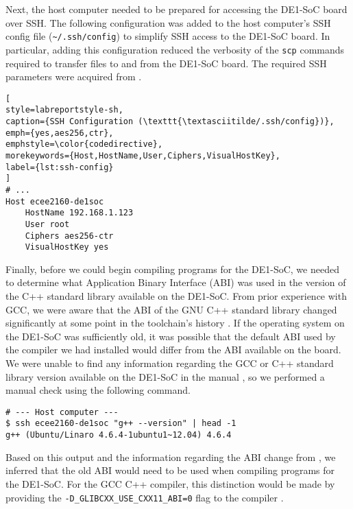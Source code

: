 \documentclass[11pt, letterpaper]{article} %
\begin{document}
Next, the host computer needed to be prepared for accessing the DE1-SoC board over SSH. The following configuration was added to the host computer's SSH config file (\texttt{\textasciitilde/.ssh/config}) to simplify SSH access to the DE1-SoC board. In particular, adding this configuration reduced the verbosity of the \texttt{scp} commands required to transfer files to and from the DE1-SoC board. The required SSH parameters were acquired from \cite{de1-soc-linux-manual,nengo-fpga-connecting-de1-soc}.

\begin{lstlisting}[
style=labreportstyle-sh, 
caption={SSH Configuration (\texttt{\textasciitilde/.ssh/config})}, 
emph={yes,aes256,ctr},
emphstyle=\color{codedirective},
morekeywords={Host,HostName,User,Ciphers,VisualHostKey},
label={lst:ssh-config}
]
# ...
Host ecee2160-de1soc
    HostName 192.168.1.123
    User root
    Ciphers aes256-ctr
    VisualHostKey yes
\end{lstlisting}

Finally, before we could begin compiling programs for the DE1-SoC, we needed to determine what Application Binary Interface (ABI) was used in the version of the C++ standard library available on the DE1-SoC. From prior experience with GCC, we were aware that the ABI of the GNU C++ standard library changed significantly at some point in the toolchain's history \cite{gnu-dual-abi}. If the operating system on the DE1-SoC was sufficiently old, it was possible that the default ABI used by the compiler we had installed would differ from the ABI available on the board. We were unable to find any information regarding the GCC or C++ standard library version available on the DE1-SoC in the manual \cite{de1-soc-linux-manual}, so we performed a manual check using the following command.
\begin{lstlisting}[style=labreportstyle-sh]
# --- Host computer --- 
$ ssh ecee2160-de1soc "g++ --version" | head -1
g++ (Ubuntu/Linaro 4.6.4-1ubuntu1~12.04) 4.6.4
\end{lstlisting}
Based on this output and the information regarding the ABI change from \cite{gnu-dual-abi}, we inferred that the old ABI would need to be used when compiling programs for the DE1-SoC. For the GCC C++ compiler, this distinction would be made by providing the \texttt{-D\_GLIBCXX\_USE\_CXX11\_ABI=0} flag to the compiler \cite{redhat-c11-abi}.


\end{document}
